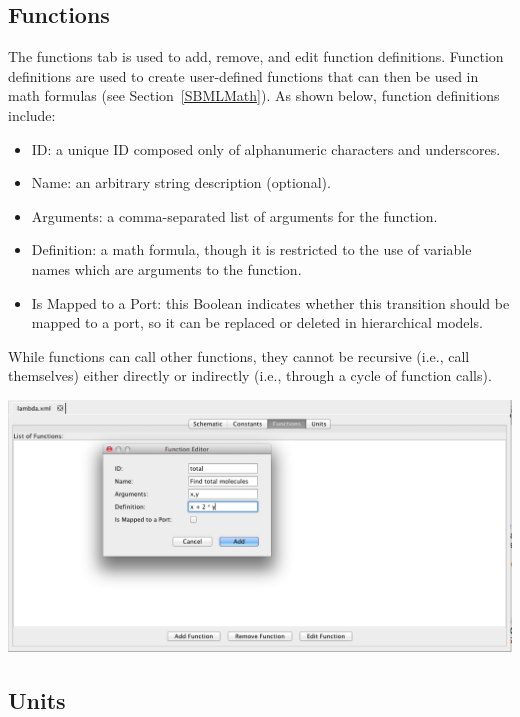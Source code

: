 \documentclass[titlepage,11pt]{article}
\begin{document}
\subsection{\label{Functions}Functions}

\noindent
The functions tab is used to add, remove, and edit function definitions. Function definitions are used to create user-defined functions that can then be used in math formulas (see Section~\ref{SBMLMath}).  As shown below, function definitions include:
\begin{itemize}
\item ID: a unique ID composed only of alphanumeric characters and underscores.
\item Name: an arbitrary string description (optional).
\item Arguments: a comma-separated list of arguments for the function.
\item Definition: a math formula, though it is restricted to the use of variable names which are arguments to the function.
\item Is Mapped to a Port: this Boolean indicates whether this transition should be mapped to a port, so it can be replaced or deleted in hierarchical models.
\end{itemize}
While functions can call other functions, they cannot be recursive (i.e., call themselves) either directly or indirectly (i.e., through a cycle of function calls).  

\begin{center}
\includegraphics[width=160mm]{screenshots/function}
\end{center}

\subsection{\label{Units}Units}
\end{document}
